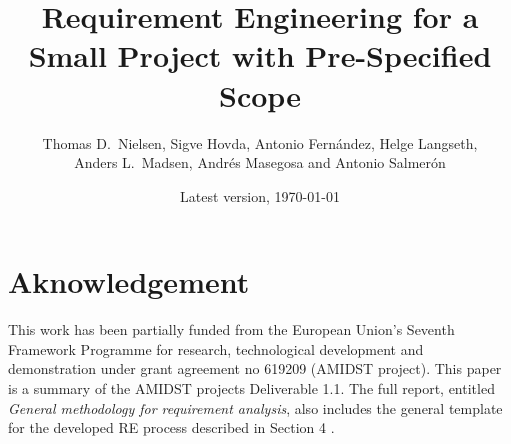 \documentclass[ukenglish]{nik}
\title{Requirement Engineering for a Small Project with Pre-Specified Scope}
\author{Thomas D.\ Nielsen, Sigve Hovda, Antonio Fern\'andez, Helge Langseth, \\
Anders L.\ Madsen, Andr\'es Masegosa and  Antonio Salmer\'on }
\date{Latest version, \today}		%
\begin{document}
\maketitle

\begin{abstract}

\end{abstract}











\section*{Aknowledgement}
This work has been partially funded from the European Union's Seventh Framework Programme for research, technological development and demonstration under grant agreement no 619209 (AMIDST project).  This paper is a summary of the AMIDST projects Deliverable 1.1. The full report, entitled \emph{General methodology for requirement analysis}, also includes the general template for the developed RE process described in Section 4 \cite{Fer14}.



\end{document}
